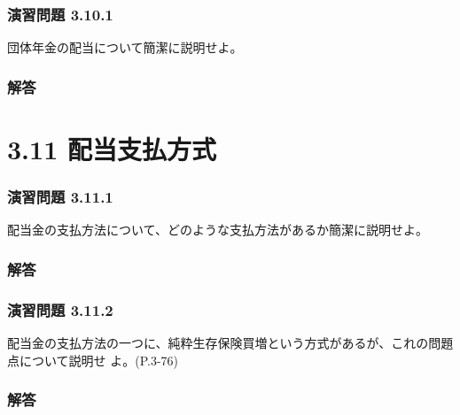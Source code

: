 \documentclass[report,gutter=10mm,fore-edge=10mm,uplatex,dvipdfmx]{jlreq}
\begin{document}
\subsubsection{演習問題 3.10.1}
団体年金の配当について簡潔に説明せよ。
\subsubsection{解答}
\section{3.11 配当支払方式}
\subsubsection{演習問題 3.11.1}
配当金の支払方法について、どのような支払方法があるか簡潔に説明せよ。
\subsubsection{解答}
\subsubsection{演習問題 3.11.2}
配当金の支払方法の一つに、純粋生存保険買増という方式があるが、これの問題点について説明せ
よ。(P.3-76)
\subsubsection{解答}
\end{document}
